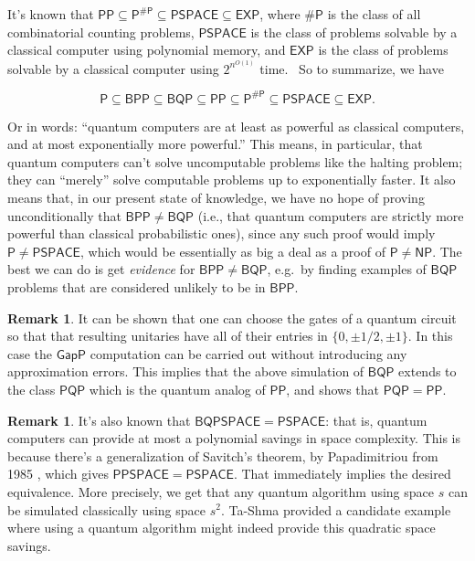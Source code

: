\documentclass[11pt]{report}
\theoremstyle{plain}
\theoremstyle{definition}
\newtheorem{remark}[theorem]{Remark}
\begin{document}
It's known that $\mathsf{PP} \subseteq \mathsf{P^{\#P}} \subseteq \mathsf{PSPACE} \subseteq \mathsf{EXP}$,
where $\mathsf{\#P}$ is the class of all combinatorial counting problems, $\mathsf{PSPACE}$ is the class
of problems solvable by a classical computer using polynomial memory, and $\mathsf{EXP}$ is the class of
problems solvable by a classical computer using $2^{n^{O(1)}}$ time. \ So to summarize, we have

$$ \mathsf{P} \subseteq \mathsf{BPP} \subseteq \mathsf{BQP} \subseteq \mathsf{PP} \subseteq \mathsf{P^{\#P}} \subseteq \mathsf{PSPACE} \subseteq \mathsf{EXP}.$$

Or in words: ``quantum computers are at least as powerful as classical computers, and at most exponentially more powerful.''  This means, in particular, that
quantum computers can't solve uncomputable problems like the halting problem; they can ``merely'' solve computable problems up to exponentially faster. It also
means that, in our present state of knowledge, we have no hope of proving unconditionally that $\mathsf{BPP} \ne \mathsf{BQP}$ (i.e., that quantum computers are strictly more powerful than classical probabilistic ones), since any such proof would imply $\mathsf{P} \ne \mathsf{PSPACE}$, which would be essentially as big a deal as a proof of $\mathsf{P} \ne \mathsf{NP}$. The best we can do is get \emph{evidence} for $\mathsf{BPP} \ne \mathsf{BQP}$, e.g.\ by finding examples of $\mathsf{BQP}$ problems that are considered unlikely to be in $\mathsf{BPP}$.

\begin{remark}
It can be shown that one can choose the gates of a quantum circuit so that that resulting
unitaries have all of their entries in $\{0,\pm 1/2,\pm 1 \}$.  In this case the $\mathsf{GapP}$ computation
can be carried out without introducing any approximation errors.
This implies that
the above simulation of $\mathsf{BQP}$ extends to the class $\mathsf{PQP}$ which
is the quantum analog of $\mathsf{PP}$, and shows that $\mathsf{PQP}=\mathsf{PP}$.
\end{remark}

\begin{remark}
It's also known that $\mathsf{BQPSPACE}=\mathsf{PSPACE}$: that is, quantum computers can provide at most a polynomial savings in space complexity.  This is because there's a generalization of Savitch's theorem, by Papadimitriou from 1985 \cite{Pap85}, which gives $\mathsf{PPSPACE}=\mathsf{PSPACE}$.  That immediately implies the desired equivalence. More precisely, we get that any quantum algorithm using space $s$ can be simulated classically using space $s^2$.
Ta-Shma \cite{TS13} provided a candidate example where using a quantum algorithm might indeed provide this quadratic space savings.
\end{remark}
\end{document}
